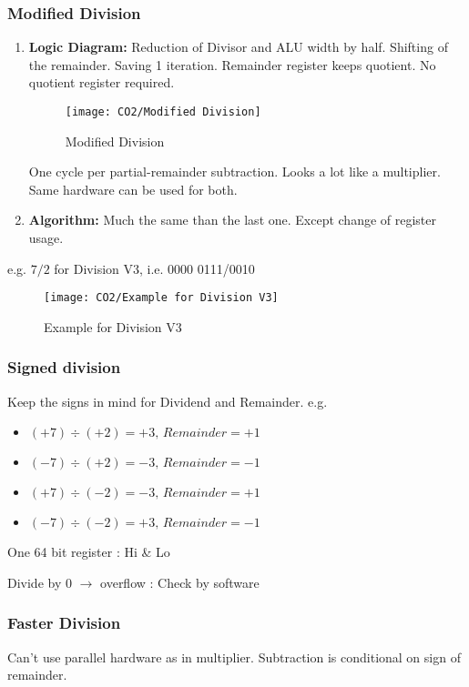 \subsubsection{Modified Division}
\begin{enumerate}
    \item \textbf{Logic Diagram:} Reduction of Divisor and ALU width by half. Shifting of the remainder. Saving 1 iteration. Remainder register keeps quotient. No quotient register required.

    \begin{figure}[H]
        \centering
        \texttt{[image: CO2/Modified Division]}
        \caption{Modified Division}
    \end{figure}
    One cycle per partial-remainder subtraction. Looks a lot like a multiplier. Same hardware can be used for both. 
    \item \textbf{Algorithm: }Much the same than the last one. Except change of register usage. 
\end{enumerate}

e.g. $7/2$ for Division V3, i.e. 0000 0111/0010

\begin{figure}[H]
    \centering
    \texttt{[image: CO2/Example for Division V3]}
    \caption{Example for Division V3}
\end{figure}




\subsubsection{Signed division}
Keep the signs in mind for Dividend and Remainder. e.g.
\begin{itemize}
    \item $(+7) \div (+2) = +3, \, Remainder = +1$
    \item $(-7) \div (+2) = -3, \, Remainder = -1$
    \item $(+7) \div (-2) = -3, \, Remainder = +1$
    \item $(-7) \div (-2) = +3, \, Remainder = -1$
\end{itemize}

One 64 bit register : Hi \& Lo

Divide by 0 $\rightarrow$ overflow : Check by software

\subsubsection{Faster Division}
Can’t use parallel hardware as in multiplier. Subtraction is conditional on sign of remainder. 

